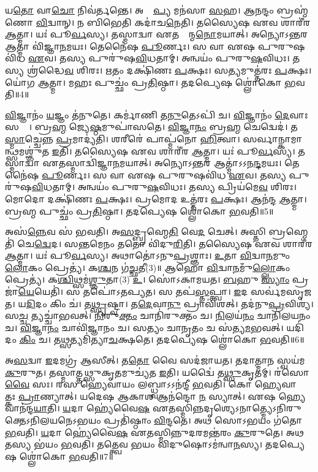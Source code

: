 𑌯\ul{𑌤𑍋} 𑌵𑌾\ul{𑌚𑍋} 𑌨𑌿𑌵॑𑌰𑍍𑌤𑌨𑍍𑌤𑍇। 
𑌅𑌪𑍍𑌰𑌾᳚\ul{𑌪𑍍𑌯} 𑌮𑌨॑𑌸𑌾 \ul{𑌸}𑌹। 
𑌆𑌨𑌨𑍍𑌦𑌂 𑌬𑍍𑌰𑌹𑍍𑌮॑𑌣𑍋 \ul{𑌵𑌿}𑌦𑍍𑌵𑌾𑌨𑍍। 
𑌨 𑌬𑌿𑌭𑍇𑌤𑌿 𑌕𑌦𑌾॑𑌚\ul{𑌨𑍇}𑌤𑌿। 
𑌤𑌸𑍍𑌯𑍈𑌷 𑌏𑌵 𑌶𑌾𑌰𑍀॑𑌰 \ul{𑌆}𑌤𑍍𑌮𑌾। 
𑌯𑌃॑ 𑌪𑍂\ul{𑌰𑍍𑌵}𑌸𑍍𑌯। 
𑌤𑌸𑍍𑌮𑌾𑌦𑍍𑌵𑌾 𑌏𑌤𑌸𑍍𑌮𑌾᳚𑌨𑍍𑌮\ul{𑌨𑍋}𑌮𑌯𑌾𑌤𑍍। 
𑌅𑌨𑍍𑌯𑍋𑌽𑌨𑍍𑌤𑌰 𑌆𑌤𑍍𑌮𑌾 𑌵𑌿॑𑌜𑍍𑌞𑌾\ul{𑌨}𑌮𑌯𑌃। 
𑌤𑍇𑌨𑍈॑𑌷 \ul{𑌪𑍂}𑌰𑍍𑌣𑌃। 
𑌸 𑌵𑌾 𑌏𑌷 𑌪𑍁𑌰𑍁𑌷𑌵𑌿॑𑌧 \ul{𑌏}𑌵। 
𑌤𑌸𑍍𑌯 𑌪𑍁𑌰𑍁॑𑌷\ul{𑌵𑌿}𑌧𑌤𑌾𑌮𑍍। 
𑌅𑌨𑍍𑌵𑌯𑌂॑ 𑌪𑍁𑌰𑍁\ul{𑌷}𑌵𑌿𑌧𑌃। 
𑌤𑌸𑍍𑌯 𑌶𑍍𑌰॑𑌦𑍍𑌧𑍈\ul{𑌵} 𑌶𑌿𑌰𑌃। 
𑌋𑌤𑌂 𑌦𑌕𑍍𑌷𑌿॑𑌣𑌃 \ul{𑌪}𑌕𑍍𑌷𑌃। 
𑌸𑌤𑍍𑌯𑌮𑍁𑌤𑍍𑌤॑𑌰𑌃 \ul{𑌪}𑌕𑍍𑌷𑌃। 
𑌯𑍋॑𑌗 \ul{𑌆}𑌤𑍍𑌮𑌾। 
𑌮𑌹𑌃 𑌪𑍁𑌚𑍍𑌛𑌂॑ 𑌪𑍍𑌰\ul{𑌤𑌿}𑌷𑍍𑌠𑌾। 
𑌤𑌦𑌪𑍍𑌯𑍇𑌷 𑌶𑍍𑌲𑍋॑𑌕𑍋 \ul{𑌭}𑌵𑌤𑌿॥4॥

\ul{𑌵𑌿}𑌜𑍍𑌞𑌾𑌨𑌂॑ \ul{𑌯}𑌜𑍍𑌞𑌂 𑌤॑𑌨𑍁𑌤𑍇। 
𑌕𑌰𑍍𑌮𑌾॑𑌣𑌿 𑌤\ul{𑌨𑍁}𑌤𑍇𑌽𑌪𑌿॑ 𑌚। 
\ul{𑌵𑌿}𑌜𑍍𑌞𑌾𑌨𑌂॑ \ul{𑌦𑍇}𑌵𑌾𑌃 𑌸𑌰𑍍𑌵𑍇᳚। 
𑌬𑍍𑌰\ul{𑌹𑍍𑌮} 𑌜𑍍𑌯𑍇\ul{𑌷𑍍𑌠}𑌮𑍁𑌪𑌾॑𑌸𑌤𑍇। 
\ul{𑌵𑌿}𑌜𑍍𑌞𑌾\ul{𑌨𑌂} 𑌬𑍍𑌰\ul{𑌹𑍍𑌮} 𑌚𑍇𑌦𑍍𑌵𑍇𑌦॑। 
𑌤\ul{𑌸𑍍𑌮𑌾}𑌚𑍍𑌚𑍇𑌨𑍍𑌨 \ul{𑌪𑍍𑌰}𑌮𑌾𑌦𑍍𑌯॑𑌤𑌿। 
𑌶𑌰𑍀𑌰𑍇॑ 𑌪𑌾𑌪𑍍𑌮॑𑌨𑍋 \ul{𑌹𑌿}𑌤𑍍𑌵𑌾। 
𑌸𑌰𑍍𑌵𑌾𑌨𑍍𑌕𑌾𑌮𑌾𑌨𑍍𑌥𑍍𑌸𑌮𑌶𑍍𑌞𑍁॑𑌤 \ul{𑌇}𑌤𑌿। 
𑌤𑌸𑍍𑌯𑍈𑌷 𑌏𑌵 𑌶𑌾𑌰𑍀॑𑌰 \ul{𑌆}𑌤𑍍𑌮𑌾। 
𑌯𑌃॑ 𑌪𑍂\ul{𑌰𑍍𑌵}𑌸𑍍𑌯। 
𑌤𑌸𑍍𑌮𑌾𑌦𑍍𑌵𑌾 𑌏𑌤𑌸𑍍𑌮𑌾𑌦𑍍𑌵𑌿॑𑌜𑍍𑌞𑌾\ul{𑌨}𑌮𑌯𑌾𑌤𑍍। 
𑌅𑌨𑍍𑌯𑍋𑌽𑌨𑍍𑌤𑌰 𑌆𑌤𑍍𑌮𑌾॑𑌽𑌽𑌨\ul{𑌨𑍍𑌦}𑌮𑌯𑌃। 
𑌤𑍇𑌨𑍈॑𑌷 \ul{𑌪𑍂}𑌰𑍍𑌣𑌃। 
𑌸 𑌵𑌾 𑌏𑌷 𑌪𑍁𑌰𑍁𑌷𑌵𑌿॑𑌧 \ul{𑌏}𑌵। 
𑌤𑌸𑍍𑌯 𑌪𑍁𑌰𑍁॑𑌷\ul{𑌵𑌿}𑌧𑌤𑌾𑌮𑍍। 
𑌅𑌨𑍍𑌵𑌯𑌂॑ 𑌪𑍁𑌰𑍁\ul{𑌷}𑌵𑌿𑌧𑌃। 
𑌤𑌸𑍍𑌯 𑌪𑍍𑌰𑌿𑌯॑𑌮𑍇\ul{𑌵} 𑌶𑌿𑌰𑌃। 
𑌮𑍋𑌦𑍋 𑌦𑌕𑍍𑌷𑌿॑𑌣𑌃 \ul{𑌪}𑌕𑍍𑌷𑌃। 
𑌪𑍍𑌰𑌮𑍋𑌦 𑌉𑌤𑍍𑌤॑𑌰𑌃 \ul{𑌪}𑌕𑍍𑌷𑌃। 
𑌆𑌨॑𑌨𑍍𑌦 \ul{𑌆}𑌤𑍍𑌮𑌾। 
𑌬𑍍𑌰𑌹𑍍𑌮 𑌪𑍁𑌚𑍍𑌛𑌂॑ 𑌪𑍍𑌰\ul{𑌤𑌿}𑌷𑍍𑌠𑌾। 
𑌤𑌦𑌪𑍍𑌯𑍇𑌷 𑌶𑍍𑌲𑍋॑𑌕𑍋 \ul{𑌭}𑌵𑌤𑌿॥5॥

𑌅𑌸॑\ul{𑌨𑍍𑌨𑍇}𑌵 𑌸॑ 𑌭𑌵𑌤𑌿। 
𑌅\ul{𑌸}𑌦𑍍𑌬𑍍𑌰𑌹𑍍𑌮𑍇\ul{𑌤𑌿} 𑌵𑍇\ul{𑌦} 𑌚𑍇𑌤𑍍। 
𑌅𑌸𑍍𑌤𑌿 𑌬𑍍𑌰𑌹𑍍𑌮𑍇𑌤𑌿॑ 𑌚𑍇\ul{𑌦𑍍𑌵𑍇}𑌦। 
𑌸𑌨𑍍𑌤𑌮𑍇𑌨𑌂 𑌤𑌤𑍋 𑌵𑌿॑𑌦𑍁\ul{𑌰𑌿}𑌤𑌿। 
𑌤𑌸𑍍𑌯𑍈𑌷 𑌏𑌵 𑌶𑌾𑌰𑍀॑𑌰 \ul{𑌆}𑌤𑍍𑌮𑌾। 
𑌯𑌃॑ 𑌪𑍂\ul{𑌰𑍍𑌵}𑌸𑍍𑌯। 
𑌅𑌥𑌾𑌤𑍋॑𑌽𑌨𑍁\ul{𑌪𑍍𑌰}𑌶𑍍𑌞𑌾𑌃। 
\ul{𑌉}𑌤𑌾 \ul{𑌵𑌿}𑌦𑍍𑌵𑌾\ul{𑌨}𑌮𑍁𑌂 \ul{𑌲𑍋}𑌕𑌂 𑌪𑍍𑌰𑍇𑌤𑍍𑌯॑। 
𑌕\ul{𑌶𑍍𑌚}𑌨 𑌗॑\ul{𑌚𑍍𑌛}𑌤𑍀(3)॥ 𑌆𑌹𑍋॑ \ul{𑌵𑌿}𑌦𑍍𑌵𑌾\ul{𑌨}𑌮𑍁𑌁\ul{𑌲𑍍𑌲𑍋}𑌕𑌂 𑌪𑍍𑌰𑍇𑌤𑍍𑌯॑। 
𑌕\ul{𑌶𑍍𑌚𑌿}𑌥𑍍𑌸𑌮॑\ul{𑌶𑍍𑌞𑍁}𑌤𑌾(3) \ul{𑌉}। 
𑌸𑍋॑𑌽𑌕𑌾𑌮𑌯𑌤। 
\ul{𑌬}𑌹𑍁 \ul{𑌸𑍍𑌯𑌾𑌂} 𑌪𑍍𑌰𑌜𑌾॑\ul{𑌯𑍇}𑌯𑍇𑌤𑌿॑। 
𑌸 𑌤𑌪𑍋॑𑌽𑌤𑌪𑍍𑌯𑌤। 
𑌸 𑌤𑌪॑\ul{𑌸𑍍𑌤}𑌪𑍍𑌤𑍍𑌵𑌾। 
\ul{𑌇}𑌦 𑌸𑌰𑍍𑌵॑𑌮𑌸𑍃𑌜𑌤। 
𑌯\ul{𑌦𑌿}𑌦𑌂 𑌕𑌿𑌂 𑌚॑। 
𑌤\ul{𑌥𑍍𑌸𑍃}𑌷𑍍𑌟𑍍𑌵𑌾। 
𑌤\ul{𑌦𑍇}𑌵𑌾\ul{𑌨𑍁} 𑌪𑍍𑌰𑌾𑌵𑌿॑𑌶𑌤𑍍। 
𑌤𑌦॑𑌨𑍁\ul{𑌪𑍍𑌰}𑌵𑌿𑌶𑍍𑌯॑। 
𑌸\ul{𑌚𑍍𑌚} 𑌤𑍍𑌯𑌚𑍍𑌚𑌾॑𑌭𑌵𑌤𑍍। 
\ul{𑌨𑌿}𑌰𑍁\ul{𑌕𑍍𑌤𑌂} 𑌚𑌾𑌨𑌿॑𑌰𑍁𑌕𑍍𑌤𑌂 𑌚। 
\ul{𑌨𑌿}𑌲𑌯॑\ul{𑌨𑌂} 𑌚𑌾𑌨𑌿॑𑌲𑌯𑌨𑌂 𑌚। 
\ul{𑌵𑌿}𑌜𑍍𑌞𑌾\ul{𑌨𑌂} 𑌚𑌾𑌵𑌿॑𑌜𑍍𑌞𑌾𑌨𑌂 𑌚। 
𑌸𑌤𑍍𑌯𑌂 𑌚𑌾𑌨𑍃𑌤𑌂 𑌚 𑌸॑𑌤𑍍𑌯\ul{𑌮}𑌭𑌵𑌤𑍍। 
𑌯𑌦𑌿॑𑌦𑌂 \ul{𑌕𑌿𑌂} 𑌚। 
𑌤𑌥𑍍𑌸𑌤𑍍𑌯𑌮𑌿॑𑌤𑍍𑌯𑌾\ul{𑌚}𑌕𑍍𑌷𑌤𑍇। 
𑌤𑌦𑌪𑍍𑌯𑍇𑌷 𑌶𑍍𑌲𑍋॑𑌕𑍋 \ul{𑌭}𑌵𑌤𑌿॥6॥

𑌅\ul{𑌸}𑌦𑍍𑌵𑌾 \ul{𑌇}𑌦𑌮𑌗𑍍𑌰॑ 𑌆𑌸𑍀𑌤𑍍। 
𑌤\ul{𑌤𑍋} 𑌵𑍈 𑌸𑌦॑𑌜𑌾𑌯𑌤। 
𑌤𑌦𑌾𑌤𑍍𑌮𑌾𑌨 𑌸𑍍𑌵𑌯॑𑌮\ul{𑌕𑍁}𑌰𑍁𑌤। 
𑌤𑌸𑍍𑌮𑌾𑌤𑍍𑌤𑌥𑍍𑌸𑍁𑌕𑍃𑌤𑌮𑍁𑌚𑍍𑌯॑𑌤 \ul{𑌇}𑌤𑌿। 
𑌯𑌦𑍍𑌵𑍈॑ 𑌤\ul{𑌥𑍍𑌸𑍁}𑌕𑍃𑌤𑌮𑍍। 
𑌰॑𑌸𑍋 \ul{𑌵𑍈} 𑌸𑌃। 
𑌰𑌸 𑌹𑍍𑌯𑍇𑌵𑌾𑌯𑌂 𑌲𑌬𑍍𑌧𑍍𑌵𑌾𑌽𑌽𑌨॑𑌨𑍍𑌦𑍀 \ul{𑌭}𑌵𑌤𑌿। 
𑌕𑍋 𑌹𑍍𑌯𑍇𑌵𑌾𑌨𑍍𑌯𑌾᳚𑌤𑍍𑌕𑌃 \ul{𑌪𑍍𑌰𑌾}𑌣𑍍𑌯𑌾𑌤𑍍। 
𑌯𑌦𑍇𑌷 𑌆𑌕𑌾𑌶 𑌆𑌨॑𑌨𑍍𑌦𑍋 \ul{𑌨} 𑌸𑍍𑌯𑌾𑌤𑍍। 
𑌏𑌷 𑌹𑍍𑌯𑍇𑌵𑌾𑌨॑𑌨𑍍𑌦\ul{𑌯𑌾}𑌤𑌿। 
\ul{𑌯}𑌦𑌾 𑌹𑍍𑌯𑍇॑𑌵𑍈\ul{𑌷} 𑌏𑌤𑌸𑍍𑌮𑌿𑌨𑍍𑌨𑌦𑍃𑌶𑍍𑌯𑍇𑌽𑌨𑌾𑌤𑍍𑌮𑍍𑌯𑍇𑌽𑌨𑌿𑌰𑍁𑌕𑍍𑌤𑍇𑌽𑌨𑌿𑌲𑌯𑌨𑍇𑌽𑌭𑌯𑌂 𑌪𑍍𑌰𑌤𑌿॑𑌷𑍍𑌠𑌾𑌂 \ul{𑌵𑌿}𑌨𑍍𑌦𑌤𑍇। 
𑌅𑌥 𑌸𑍋𑌽𑌭𑌯𑌂 𑌗॑𑌤𑍋 \ul{𑌭}𑌵𑌤𑌿। 
\ul{𑌯}𑌦𑌾 𑌹𑍍𑌯𑍇॑𑌵𑍈\ul{𑌷} 𑌏𑌤𑌸𑍍𑌮𑌿𑌨𑍍𑌨𑍁𑌦𑌰𑌮𑌨𑍍𑌤॑𑌰𑌂 \ul{𑌕𑍁}𑌰𑍁𑌤𑍇। 
𑌅𑌥 𑌤𑌸𑍍𑌯 𑌭॑𑌯𑌂 \ul{𑌭}𑌵𑌤𑌿। 
𑌤𑌤𑍍𑌤𑍍𑌵𑍇𑌵 𑌭𑌯𑌂 𑌵𑌿𑌦𑍁𑌷𑍋𑌽𑌮॑𑌨𑍍𑌵𑌾\ul{𑌨}𑌸𑍍𑌯। 
𑌤𑌦𑌪𑍍𑌯𑍇𑌷 𑌶𑍍𑌲𑍋॑𑌕𑍋 \ul{𑌭}𑌵𑌤𑌿॥7॥

